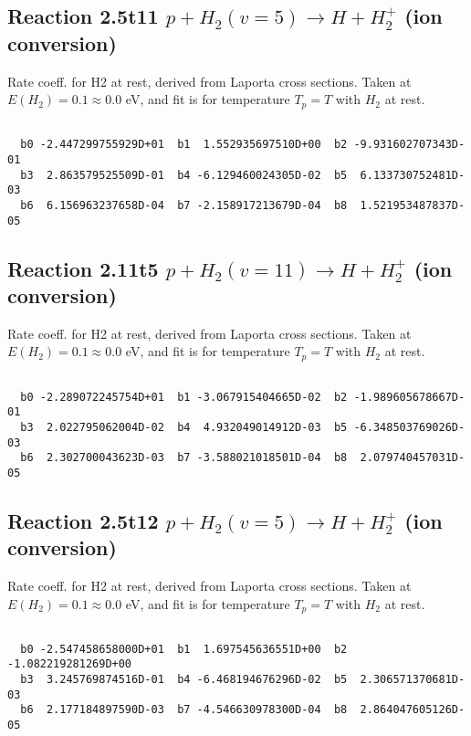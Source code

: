 \documentclass[12pt,dvipdfmx]{article}
\begin{document}
\newpage
\subsection{
Reaction 2.5t11
$ p + H_2(v=5) \rightarrow H + H_2^+$ (ion conversion)
}
Rate coeff. for H2 at rest, derived from Laporta cross sections.
Taken at $E(H_2) = 0.1 \approx 0.0$ eV,  and fit is for temperature $T_p=T$ with $H_2$ at rest.

\begin{small}\begin{verbatim}

  b0 -2.447299755929D+01  b1  1.552935697510D+00  b2 -9.931602707343D-01
  b3  2.863579525509D-01  b4 -6.129460024305D-02  b5  6.133730752481D-03
  b6  6.156963237658D-04  b7 -2.158917213679D-04  b8  1.521953487837D-05

\end{verbatim}\end{small}

\newpage
\subsection{
Reaction 2.11t5
$ p + H_2(v=11) \rightarrow H + H_2^+$ (ion conversion)
}
Rate coeff. for H2 at rest, derived from Laporta cross sections.
Taken at $E(H_2) = 0.1 \approx 0.0$ eV,  and fit is for temperature $T_p=T$ with $H_2$ at rest.

\begin{small}\begin{verbatim}

  b0 -2.289072245754D+01  b1 -3.067915404665D-02  b2 -1.989605678667D-01
  b3  2.022795062004D-02  b4  4.932049014912D-03  b5 -6.348503769026D-03
  b6  2.302700043623D-03  b7 -3.588021018501D-04  b8  2.079740457031D-05

\end{verbatim}\end{small}

\newpage
\subsection{
Reaction 2.5t12
$ p + H_2(v=5) \rightarrow H + H_2^+$ (ion conversion)
}
Rate coeff. for H2 at rest, derived from Laporta cross sections.
Taken at $E(H_2) = 0.1 \approx 0.0$ eV,  and fit is for temperature $T_p=T$ with $H_2$ at rest.

\begin{small}\begin{verbatim}

  b0 -2.547458658000D+01  b1  1.697545636551D+00  b2 -1.082219281269D+00
  b3  3.245769874516D-01  b4 -6.468194676296D-02  b5  2.306571370681D-03
  b6  2.177184897590D-03  b7 -4.546630978300D-04  b8  2.864047605126D-05

\end{verbatim}\end{small}
\end{document}
